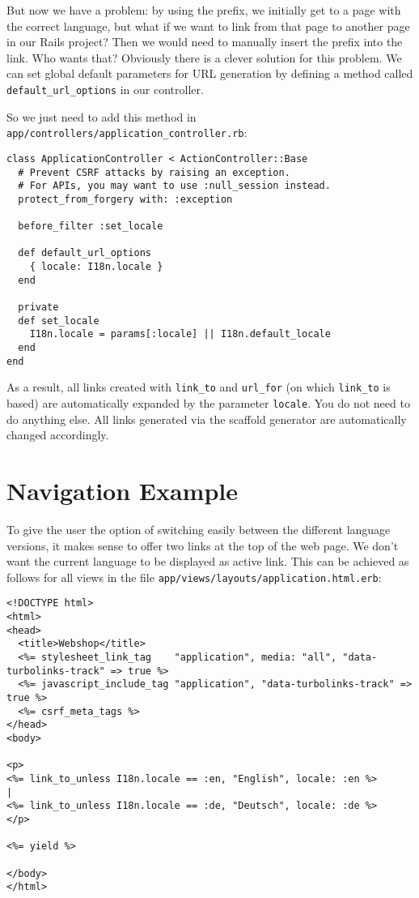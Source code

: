 \documentclass[a4paper]{book}
\begin{document}
But now we have a problem: by using the prefix, we initially get to a page with the correct language, but what if we want to link from that page to another page in our Rails project? Then we would need to manually insert the prefix into the link. Who wants that? Obviously there is a clever solution for this problem. We can set global default parameters for URL generation by defining a method called \texttt{default\_url\_options} in our controller.

So we just need to add this method in \texttt{app/controllers/application\_controller.rb}:

\begin{shaded}\begin{verbatim}
class ApplicationController < ActionController::Base
  # Prevent CSRF attacks by raising an exception.
  # For APIs, you may want to use :null_session instead.
  protect_from_forgery with: :exception

  before_filter :set_locale

  def default_url_options
    { locale: I18n.locale }
  end

  private
  def set_locale
    I18n.locale = params[:locale] || I18n.default_locale
  end
end
\end{verbatim}\end{shaded}

As a result, all links created with \texttt{link\_to} and \texttt{url\_for} (on which \texttt{link\_to} is based) are automatically expanded by the parameter \texttt{locale}. You do not need to do anything else. All links generated via the scaffold generator are automatically changed accordingly.

\section{Navigation Example}\label{navigation-example}

To give the user the option of switching easily between the different language versions, it makes sense to offer two links at the top of the web page. We don't want the current language to be displayed as active link. This can be achieved as follows for all views in the file \texttt{app/views/layouts/application.html.erb}:

\begin{shaded}\begin{verbatim}
<!DOCTYPE html>
<html>
<head>
  <title>Webshop</title>
  <%= stylesheet_link_tag    "application", media: "all", "data-turbolinks-track" => true %>
  <%= javascript_include_tag "application", "data-turbolinks-track" => true %>
  <%= csrf_meta_tags %>
</head>
<body>

<p>
<%= link_to_unless I18n.locale == :en, "English", locale: :en %>
|
<%= link_to_unless I18n.locale == :de, "Deutsch", locale: :de %>
</p>

<%= yield %>

</body>
</html>
\end{verbatim}\end{shaded}
\end{document}
